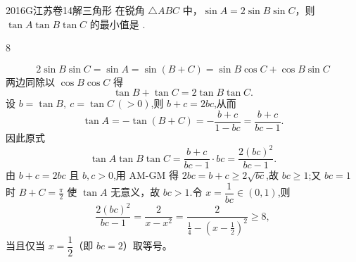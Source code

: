 
\begin{problem}{2016}{G}{江苏卷}{14}{解三角形}
在锐角 $\triangle ABC$ 中，$\sin A = 2\sin B\sin C$，则 $\tan A\tan B\tan C$ 的最小值是 \underline{\hspace{4em}}.
\end{problem}

\begin{answer}
$8$
\end{answer}

\begin{solutions}
$$
2\sin B\sin C=\sin A=\sin(B+C)=\sin B\cos C+\cos B\sin C
$$
两边同除以 $\cos B\cos C$ 得
$$
\tan B+\tan C=2\tan B\tan C.
$$
设 $b=\tan B,\ c=\tan C\,(>0)$,则 $b+c=2bc$,从而
$$
\tan A=-\tan(B+C)=-\frac{b+c}{1-bc}=\frac{b+c}{bc-1}.
$$
因此原式
$$
\tan A\tan B\tan C=\frac{b+c}{bc-1}\cdot bc=\frac{2(bc)^2}{bc-1}.
$$
由 $b+c=2bc$ 且 $b,c>0$,用 AM-GM 得 $2bc=b+c\ge 2\sqrt{bc}$,故 $bc\ge 1$;又 $bc=1$ 时 $B+C=\frac{\pi}{2}$ 使 $\tan A$ 无意义，故 $bc>1$.令 $x=\dfrac1{bc}\in(0,1)$,则
$$
\frac{2(bc)^2}{bc-1}=\frac{2}{x-x^2}=\frac{2}{\frac14-\left(x-\frac12\right)^2}\ge 8,
$$
当且仅当 $x=\dfrac12$（即 $bc=2$）取等号。
\end{solutions}